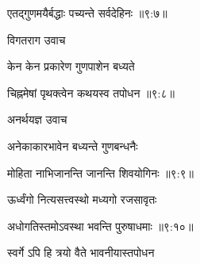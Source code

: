
{\devanagarifont एतद्गुणमयैर्बद्धाः पच्यन्ते सर्वदेहिनः {॥९:७॥} \veg\dontdisplaylinenum }%

{\devanagarifont विगतराग उवाच {\dandab}\dontdisplaylinenum  }%
 
{\devanagarifont केन केन प्रकारेण गुणपाशेन बध्यते \thinspace{\danda} \dontdisplaylinenum }%


{\devanagarifont चिह्नमेषां पृथक्त्वेन कथयस्व तपोधन {॥९:८॥} \veg\dontdisplaylinenum }%

{\devanagarifont अनर्थयज्ञ उवाच {\dandab}\dontdisplaylinenum  }%
 
{\devanagarifont अनेकाकारभावेन बध्यन्ते गुणबन्धनैः \thinspace{\danda} \dontdisplaylinenum }%
 

{\devanagarifont मोहिता नाभिजानन्ति जानन्ति शिवयोगिनः {॥९:९॥} \veg\dontdisplaylinenum }%

{\devanagarifont ऊर्ध्वंगो नित्यसत्त्वस्थो मध्यगो रजसावृतः \thinspace{\dandab} \dontdisplaylinenum }%


{\devanagarifont अधोगतिस्तमोऽवस्था भवन्ति पुरुषाधमाः {॥९:१०॥} \veg\dontdisplaylinenum }%

{\devanagarifont स्वर्गे ऽपि हि त्रयो वैते भावनीयास्तपोधन \thinspace{\dandab} \dontdisplaylinenum }%
 
